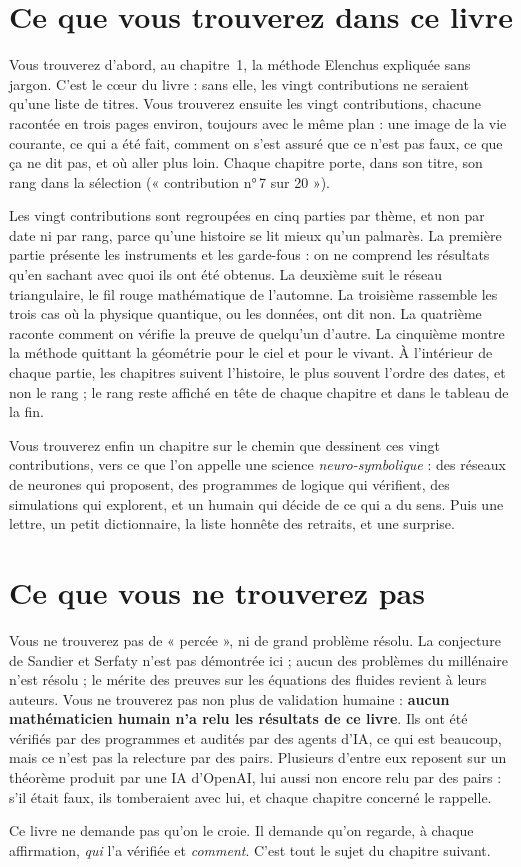 \section{Ce que vous trouverez dans ce livre}

Vous trouverez d'abord, au chapitre~1, la méthode Elenchus expliquée sans jargon. C'est le cœur du livre : sans
elle, les vingt contributions ne seraient qu'une liste de titres. Vous trouverez ensuite les vingt contributions, chacune
racontée en trois pages environ, toujours avec le même plan : une image de la vie courante, ce qui a été fait, comment
on s'est assuré que ce n'est pas faux, ce que ça ne dit pas, et où aller plus loin. Chaque chapitre porte, dans son
titre, son rang dans la sélection (« contribution n°\,7 sur 20 »).

Les vingt contributions sont regroupées en cinq parties par thème, et non par date ni par rang, parce qu'une histoire
se lit mieux qu'un palmarès. La première partie présente les instruments et les garde-fous : on ne comprend les
résultats qu'en sachant avec quoi ils ont été obtenus. La deuxième suit le réseau triangulaire, le fil rouge
mathématique de l'automne. La troisième rassemble les trois cas où la physique quantique, ou les données, ont dit non.
La quatrième raconte comment on vérifie la preuve de quelqu'un d'autre. La cinquième montre la méthode quittant la
géométrie pour le ciel et pour le vivant. À l'intérieur de chaque partie, les chapitres suivent l'histoire, le plus
souvent l'ordre des dates, et non le rang ; le rang reste affiché en tête de chaque chapitre et dans le tableau
de la fin.

Vous trouverez enfin un chapitre sur le chemin que dessinent ces vingt contributions, vers ce que l'on appelle une
science \emph{neuro-symbolique} : des réseaux de neurones qui proposent, des programmes de logique qui vérifient, des
simulations qui explorent, et un humain qui décide de ce qui a du sens. Puis une lettre, un petit dictionnaire, la
liste honnête des retraits, et une surprise.

\section{Ce que vous ne trouverez pas}

Vous ne trouverez pas de « percée », ni de grand problème résolu. La conjecture de Sandier et Serfaty n'est pas
démontrée ici ; aucun des problèmes du millénaire n'est résolu ; le mérite des preuves sur les équations des fluides
revient à leurs auteurs. Vous ne trouverez pas non plus de validation humaine : \textbf{aucun mathématicien humain n'a
relu les résultats de ce livre}. Ils ont été vérifiés par des programmes et audités par des agents d'IA, ce qui est
beaucoup, mais ce n'est pas la relecture par des pairs. Plusieurs d'entre eux reposent sur un théorème produit par une
IA d'OpenAI, lui aussi non encore relu par des pairs : s'il était faux, ils tomberaient avec lui, et chaque chapitre
concerné le rappelle.

Ce livre ne demande pas qu'on le croie. Il demande qu'on regarde, à chaque affirmation, \emph{qui} l'a vérifiée et
\emph{comment}. C'est tout le sujet du chapitre suivant.
